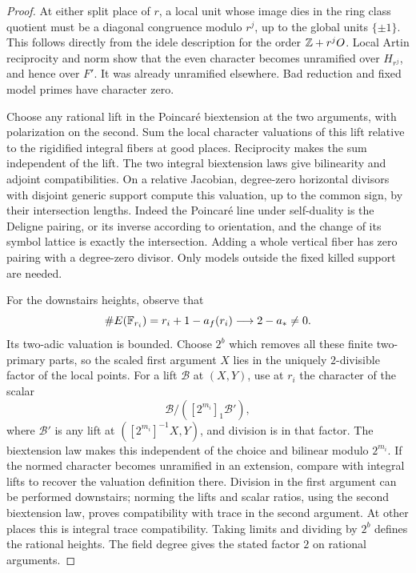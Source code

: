 \begin{proof}
At either split place of \(r\), a local unit whose image dies in the
ring class quotient must be a diagonal congruence modulo \(r^j\),
up to the global units \(\{\pm1\}\). This follows directly from the
idele description for the order \(\mathbb Z+r^jO\). Local Artin reciprocity
and norm show that the even character becomes unramified over
\(H_{r^j}\), and hence over \(F'\). It was already unramified elsewhere.
Bad reduction and fixed model primes have character zero.

Choose any rational lift in the Poincaré biextension at the two
arguments, with polarization on the second. Sum the local character
valuations of this lift relative to the rigidified integral fibers
at good places. Reciprocity makes the sum independent of the lift.
The two integral biextension laws give bilinearity and adjoint
compatibilities. On a relative Jacobian, degree-zero horizontal
divisors with disjoint generic support compute this valuation,
up to the common sign, by their intersection lengths. Indeed the
Poincaré line under self-duality is the Deligne pairing, or its
inverse according to orientation, and the change of its symbol
lattice is exactly the intersection. Adding a whole vertical fiber
has zero pairing with a degree-zero divisor. Only models outside
the fixed killed support are needed.

For the downstairs heights, observe that
\[
 \#E(\mathbb F_{r_i})=r_i+1-a_f(r_i)\longrightarrow2-a_*\ne0.
\]
Its two-adic valuation is bounded. Choose \(2^b\) which removes all
these finite two-primary parts, so the scaled first argument \(X\)
lies in the uniquely \(2\)-divisible factor of the local points.
For a lift \(\mathcal B\) at \((X,Y)\), use at \(r_i\) the character
of the scalar
\[
 \mathcal B/([2^{m_i}]_1\mathcal B'),
\]
where \(\mathcal B'\) is any lift at
\(([2^{m_i}]^{-1}X,Y)\), and division is in that factor.
The biextension law makes this independent of the choice and
bilinear modulo \(2^{m_i}\). If the normed character becomes
unramified in an extension, compare with integral lifts to recover
the valuation definition there. Division in the first argument
can be performed downstairs; norming the lifts and scalar ratios,
using the second biextension law, proves compatibility with trace
in the second argument. At other places this is integral trace
compatibility. Taking limits and dividing by \(2^b\) defines the
rational heights. The field degree gives the stated factor \(2\)
on rational arguments.


\end{proof}
